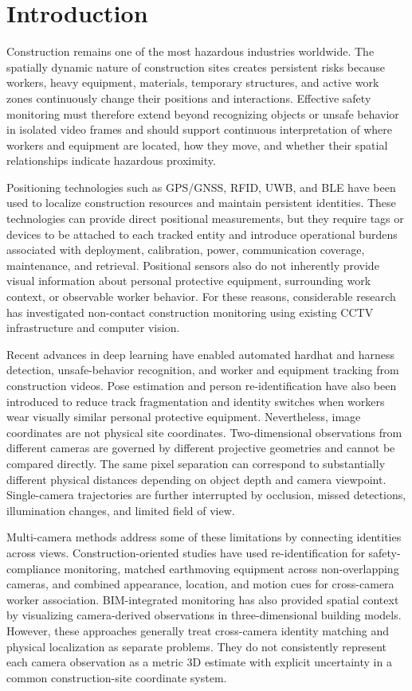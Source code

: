 \section{Introduction}
\label{sec:introduction}

Construction remains one of the most hazardous industries worldwide. The spatially dynamic nature of construction sites creates persistent risks because workers, heavy equipment, materials, temporary structures, and active work zones continuously change their positions and interactions. Effective safety monitoring must therefore extend beyond recognizing objects or unsafe behavior in isolated video frames and should support continuous interpretation of where workers and equipment are located, how they move, and whether their spatial relationships indicate hazardous proximity.

Positioning technologies such as GPS/GNSS, RFID, UWB, and BLE have been used to localize construction resources and maintain persistent identities. These technologies can provide direct positional measurements, but they require tags or devices to be attached to each tracked entity and introduce operational burdens associated with deployment, calibration, power, communication coverage, maintenance, and retrieval. Positional sensors also do not inherently provide visual information about personal protective equipment, surrounding work context, or observable worker behavior. For these reasons, considerable research has investigated non-contact construction monitoring using existing CCTV infrastructure and computer vision.

Recent advances in deep learning have enabled automated hardhat and harness detection, unsafe-behavior recognition, and worker and equipment tracking from construction videos. Pose estimation and person re-identification have also been introduced to reduce track fragmentation and identity switches when workers wear visually similar personal protective equipment. Nevertheless, image coordinates are not physical site coordinates. Two-dimensional observations from different cameras are governed by different projective geometries and cannot be compared directly. The same pixel separation can correspond to substantially different physical distances depending on object depth and camera viewpoint. Single-camera trajectories are further interrupted by occlusion, missed detections, illumination changes, and limited field of view.

Multi-camera methods address some of these limitations by connecting identities across views. Construction-oriented studies have used re-identification for safety-compliance monitoring, matched earthmoving equipment across non-overlapping cameras, and combined appearance, location, and motion cues for cross-camera worker association. BIM-integrated monitoring has also provided spatial context by visualizing camera-derived observations in three-dimensional building models. However, these approaches generally treat cross-camera identity matching and physical localization as separate problems. They do not consistently represent each camera observation as a metric 3D estimate with explicit uncertainty in a common construction-site coordinate system.

